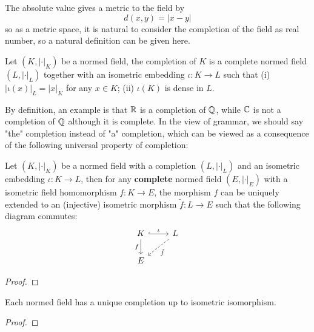The absolute value gives a metric to the field by
\[d(x,y) = |x-y|\]
so as a metric space, it is natural to consider the completion of the field as real number, so a natural definition can be given here.

\begin{definition}
    Let \((K,|\cdot|_K)\) be a normed field, the completion of \(K\) is a complete normed field \((L,|\cdot|_L)\) together with an isometric embedding \(\iota: K \to L\) such that (i) \(|\iota(x)|_L = |x|_K\) for any \(x \in K\); (ii) \(\iota(K)\) is dense in \(L\).
\end{definition}

By definition, an example is that \(\mathbb{R}\) is a completion of \(\mathbb{Q}\), while \(\mathbb{C}\) is not a completion of \(\mathbb{Q}\) although it is complete. In the view of grammar, we should say "the" completion instead of "a" completion, which can be viewed as a consequence of the following universal property of completion:

\begin{proposition}[UP-completion] \label{UP-completion}
    Let \((K,|\cdot|_K)\) be a normed field with a completion \((L,|\cdot|_L)\) and an isometric embedding \(\iota: K \to L\), then for any \textbf{complete} normed field \((E,|\cdot|_E)\) with a isometric field homomorphism \(f:K \to E\), the morphism \(f\) can be uniquely extended to an (injective) isometric morphism \(\tilde{f}:L \to E\) such that the following diagram commutes:
\[\begin{tikzcd}
	K & L \\
	E
	\arrow["\iota", hook, from=1-1, to=1-2]
	\arrow["f"', from=1-1, to=2-1]
	\arrow["{\tilde{f}}", dashed, from=1-2, to=2-1]
\end{tikzcd}\]
\end{proposition}

\begin{proof}
    
\end{proof}

\begin{corollary}
    Each normed field has a unique completion up to isometric isomorphism.
\end{corollary}

\begin{proof}
    
\end{proof}

